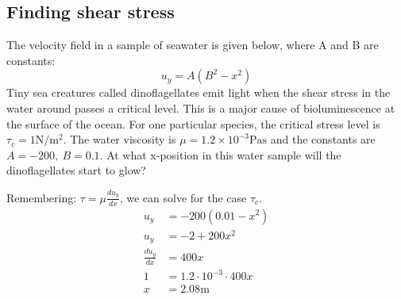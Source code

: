 \documentclass[class=report, crop=false, 12pt,a4paper]{standalone}
\begin{document}
\subsection{Finding shear stress}
The velocity field in a sample of seawater is given below, where A and B are constants:
\begin{equation} 
  u_y = A(B^2-x^2)
\end{equation}
Tiny sea creatures called dinoflagellates emit light when the shear stress in the water around passes a critical level. This is a major cause of bioluminescence at the surface of the ocean. For one particular species, the critical stress level is \(\tau_c = 1 \si{\newton\per\meter\squared}\). The water viscosity is \( \mu = 1.2 \times 10^{-3} \si{\pascal\second} \) and the constants are \(A = -200, \ B=0.1 \). At what x-position in this water sample will the dinoflagellates start to glow?

Remembering: \( \tau = \mu \frac{du_y}{dx} \), we can solve for the case \(\tau_c\).
\begin{align}
  u_y &= -200(0.01-x^2)\\
  u_y &= -2 +200x^2\\
  \frac{du_y}{dx} &= 400x\\
  1 &= 1.2 \cdot 10^{-3} \cdot 400x\\
  x &= 2.08\si{\meter}
\end{align}
\end{document}
